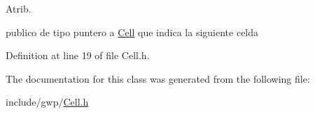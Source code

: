 Atrib. 

publico de tipo puntero a \hyperlink{class_cell}{Cell} que indica la siguiente celda 

Definition at line 19 of file Cell.\+h.



The documentation for this class was generated from the following file\+:\begin{DoxyCompactItemize}
\item 
include/gwp/\hyperlink{_cell_8h}{Cell.\+h}\end{DoxyCompactItemize}
